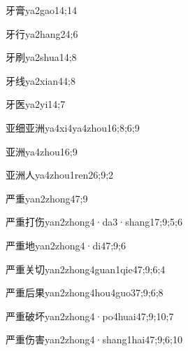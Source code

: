 \begin{verbete}{牙膏}{ya2gao1}{4;14}
\end{verbete}
\begin{verbete}{牙行}{ya2hang2}{4;6}
\end{verbete}
\begin{verbete}{牙刷}{ya2shua1}{4;8}
\end{verbete}
\begin{verbete}{牙线}{ya2xian4}{4;8}
\end{verbete}
\begin{verbete}{牙医}{ya2yi1}{4;7}
\end{verbete}
\begin{verbete}{亚细亚洲}{ya4xi4ya4zhou1}{6;8;6;9}
\end{verbete}
\begin{verbete}{亚洲}{ya4zhou1}{6;9}
\end{verbete}
\begin{verbete}{亚洲人}{ya4zhou1ren2}{6;9;2}
\end{verbete}
\begin{verbete}{严重}{yan2zhong4}{7;9}
\end{verbete}
\begin{verbete}{严重打伤}{yan2zhong4·da3·shang1}{7;9;5;6}
\end{verbete}
\begin{verbete}{严重地}{yan2zhong4·di4}{7;9;6}
\end{verbete}
\begin{verbete}{严重关切}{yan2zhong4guan1qie4}{7;9;6;4}
\end{verbete}
\begin{verbete}{严重后果}{yan2zhong4hou4guo3}{7;9;6;8}
\end{verbete}
\begin{verbete}{严重破坏}{yan2zhong4·po4huai4}{7;9;10;7}
\end{verbete}
\begin{verbete}{严重伤害}{yan2zhong4·shang1hai4}{7;9;6;10}
\end{verbete}
